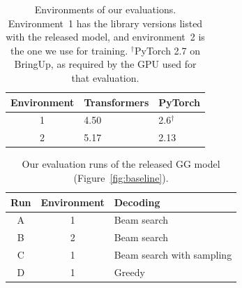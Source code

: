 \documentclass{article}
\begin{document}
\begin{table}[h]
\centering
\caption{Environments of our evaluations. Environment~1 has the library versions listed with the released model, and environment~2 is the one we use for training. $^\dagger$PyTorch 2.7 on BringUp, as required by the GPU used for that evaluation.}
\label{tab:software}
\small
%
\begin{tabular}{@{}cll@{}}
\toprule
Environment & Transformers & PyTorch \\
\midrule
1 & 4.50 & 2.6$^\dagger$ \\
2 & 5.17 & 2.13 \\
\bottomrule
\end{tabular}
\end{table}

\begin{table}[h]
\centering
\caption{Our evaluation runs of the released GG model (Figure~\ref{fig:baseline}).}
\label{tab:runs}
\small
%
\begin{tabular}{@{}ccl@{}}
\toprule
Run & Environment & Decoding \\
\midrule
A & 1 & Beam search \\
B & 2 & Beam search \\
C & 1 & Beam search with sampling \\
D & 1 & Greedy \\
\bottomrule
\end{tabular}
\end{table}
\end{document}
